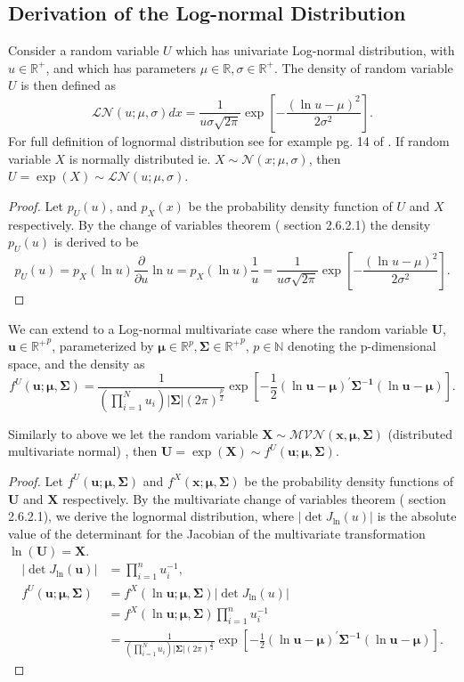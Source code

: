 \documentclass[11pt,letterpaper]{article}
\numberwithin{equation}{section}
\numberwithin{equation}{section}
\numberwithin{equation}{section}
\begin{document}
\subsection{Derivation of the Log-normal Distribution }
Consider a random variable $U$ which has univariate Log-normal distribution, with $u \in \mathbb{R}^+$, and which has parameters $\mu \in \mathbb{R}, \sigma \in \mathbb{R}^+ $. The density of random variable $U$ is then defined  as
$$\mathcal{LN}(u; \mu, \sigma)dx = \frac{1}{u\sigma\sqrt{2\pi}}\exp\left[-\frac{(\ln u - \mu)^2}{2\sigma^2}	\right].$$ 
For full definition of lognormal distribution see for example pg. 14 of \cite{johnson1995continuous}. If random variable $X$ is normally distributed ie. $ X \sim \mathcal{N}(x; \mu, \sigma) $, then $U = \exp{(X)}\sim \mathcal{LN}(u; \mu, \sigma) $. 
\begin{proof}
Let $p_U(u)$, and $ p_X(x) $ be the probability density function of $U$ and $X$ respectively. By the change of variables theorem (\cite{murphy2012machine} section 2.6.2.1) the density $p_U(u)$ is derived to be
$$p_U(u) = p_X(\ln u )\frac{\partial}{\partial u} \ln u  =  p_X(\ln u ) \frac{1}{u} =  \frac{1}{u\sigma\sqrt{2\pi}}\exp\left[-\frac{(\ln u - \mu)^2}{2\sigma^2}	\right].$$
\end{proof}
We can extend to a Log-normal multivariate case where the random variable $\bm{U} $, $\bm{u} \in \mathbb{R^{+}}^p $, parameterized by $ \bm{\mu} \in \mathbb{R}^p, \bm{\Sigma} \in  \mathbb{R^{+}}^p \label{changeVarUni} $, $p \in \mathbb{N}$ denoting the p-dimensional space, and the density as
$$ f^U(\bm{u}; \bm{\mu } , \bm{\Sigma} )= \frac{1}{(\prod_{i=1}^{N}u_{i})| \bm{\Sigma} |(2 \pi)^{\frac{p}{2}}}   \exp\left[-\frac{1}{2}(\ln \bm{u} -\bm{\mu})^{'}  \bm{\Sigma^{-1}}(\ln \bm{u} -\bm{\mu})\right].  $$

Similarly to above we let the random variable $\bm{X} \sim \mathcal{MVN}(\bm{x}, \bm{\mu},\bm{\Sigma}) $ (distributed multivariate normal) , then $\bm{U} = \exp(\bm{X} ) \sim  f^U(\bm{u}; \bm{\mu } , \bm{\Sigma} )$.  

\begin{proof}
Let $f^U(\bm{u}; \bm{\mu},\bm{\Sigma})$ and $f^X(\bm{x}; \bm{\mu},\bm{\Sigma})$ be the probability density functions of $\bm{U}$ and $\bm{X}$ respectively. By the multivariate change of variables theorem (\cite{murphy2012machine} section 2.6.2.1), we derive the lognormal distribution, where $ | \det J_{\ln} (u) | $ is the absolute value of the determinant for the Jacobian of the multivariate transformation $\ln(\bm{U}) = \bm{X} $. 
\begin{align*}
 | \det J_{\ln} (\bm{u}) | & = \prod_{i=1}^n u_i^{-1}, \\
 f^U(\bm{u}; \bm{\mu},\bm{\Sigma})  & =  f^X(\ln \bm{u}; \bm{\mu},\bm{\Sigma})  | \det J_{\ln} (u) | \\
  & = f^X(\ln \bm{u}; \bm{\mu},\bm{\Sigma})\prod_{i=1}^n u_i^{-1} \\
  & =  \frac{1}{(\prod_{i=1}^{N}u_{i})| \bm{\Sigma} |(2 \pi)^{\frac{p}{2}}}   \exp\left[-\frac{1}{2}(\ln \bm{u} -\bm{\mu})^{'}  \bm{\Sigma^{-1}}(\ln \bm{u} -\bm{\mu})\right].  
  \end{align*}
\end{proof}



\end{document}
